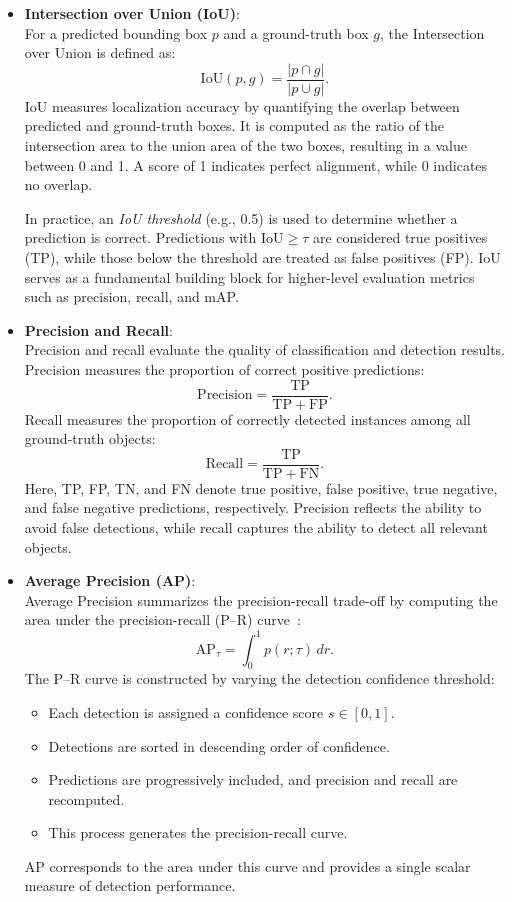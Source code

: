 \documentclass[12pt,a4paper]{report}
\newcommand{\TP}{\mathrm{TP}}
\newcommand{\FP}{\mathrm{FP}}
\newcommand{\FN}{\mathrm{FN}}
\newcommand{\IoU}{\mathrm{IoU}}
\newcommand{\AP}{\mathrm{AP}}
\begin{document}
\begin{itemize}[leftmargin=1.5em]

    \item \textbf{Intersection over Union (IoU)}:\\
    For a predicted bounding box \(p\) and a ground-truth box \(g\), the Intersection over Union is defined as:
    \[
        \IoU(p,g) = \frac{|p \cap g|}{|p \cup g|}.
    \]
    IoU measures localization accuracy by quantifying the overlap between predicted and ground-truth boxes.
    It is computed as the ratio of the intersection area to the union area of the two boxes, resulting in a value between 0 and 1.
    A score of 1 indicates perfect alignment, while 0 indicates no overlap.

    In practice, an \textit{IoU threshold} (e.g., 0.5) is used to determine whether a prediction is correct.
    Predictions with \(\IoU \geq \tau\) are considered true positives (TP), while those below the threshold are treated as false positives (FP).
    IoU serves as a fundamental building block for higher-level evaluation metrics such as precision, recall, and mAP.

    \item \textbf{Precision and Recall}:\\
    Precision and recall evaluate the quality of classification and detection results. Precision measures the proportion of correct positive predictions:
    \[
        \text{Precision} = \frac{\TP}{\TP + \FP}.
    \]
    Recall measures the proportion of correctly detected instances among all ground-truth objects:
    \[
        \text{Recall} = \frac{\TP}{\TP + \FN}.
    \]
    Here, TP, FP, TN, and FN denote true positive, false positive, true negative, and false negative predictions, respectively.
    Precision reflects the ability to avoid false detections, while recall captures the ability to detect all relevant objects.

    \item \textbf{Average Precision (AP)}:\\
    Average Precision summarizes the precision-recall trade-off by computing the area under the precision-recall (P--R) curve~\cite{Goodfellow2016}:
    \[
        \AP_{\tau} = \int_{0}^{1} p(r;\tau)\,dr.
    \]
    The P--R curve is constructed by varying the detection confidence threshold:
    \begin{itemize}[leftmargin=1.5em]
        \item Each detection is assigned a confidence score \(s \in [0,1]\).
        \item Detections are sorted in descending order of confidence.
        \item Predictions are progressively included, and precision and recall are recomputed.
        \item This process generates the precision-recall curve.
    \end{itemize}
    AP corresponds to the area under this curve and provides a single scalar measure of detection performance.


\end{itemize}
\end{document}
